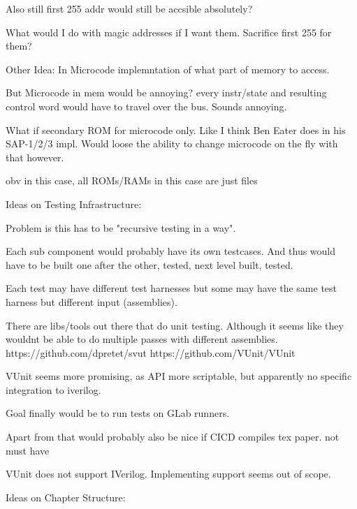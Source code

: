 Also still first 255 addr would still be accsible absolutely?

What would I do with magic addresses if I want them. Sacrifice first 255 for them?

Other Idea: In Microcode implemntation of what part of memory to access. 

But Microcode in mem would be annoying? every instr/state and resulting control word would have to travel over the bus. Sounds annoying. 

What if secondary ROM for microcode only. Like I think Ben Eater does in his SAP-1/2/3 impl.
Would loose the ability to change microcode on the fly with that however. 

obv in this case, all ROMs/RAMs in this case are just files


Ideas on Testing Infrastructure:

Problem is this has to be "recursive testing in a way". 

Each sub component would probably have its own testcases. And thus would have to be built one after the other, tested, next level built, tested. 

Each test may have different test harnesses but some may have the same test harness but different input (assemblies). 


There are libs/tools out there that do unit testing. Although it seems like they wouldnt be able to do multiple passes with different assemblies. https://github.com/dpretet/svut https://github.com/VUnit/VUnit

VUnit seems more promising, as API more scriptable, but apparently no specific integration to iverilog.

Goal finally would be to run tests on GLab runners. 



Apart from that would probably also be nice if CICD compiles tex paper. not must have

VUnit does not support IVerilog. Implementing support seems out of scope. 




Ideas on Chapter Structure:


